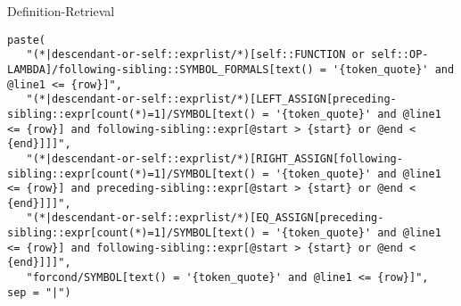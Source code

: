 \begin{frame}[fragile]{Definition-Retrieval}
%
\begin{verbatim}
paste(
   "(*|descendant-or-self::exprlist/*)[self::FUNCTION or self::OP-LAMBDA]/following-sibling::SYMBOL_FORMALS[text() = '{token_quote}' and @line1 <= {row}]",
   "(*|descendant-or-self::exprlist/*)[LEFT_ASSIGN[preceding-sibling::expr[count(*)=1]/SYMBOL[text() = '{token_quote}' and @line1 <= {row}] and following-sibling::expr[@start > {start} or @end < {end}]]]",
   "(*|descendant-or-self::exprlist/*)[RIGHT_ASSIGN[following-sibling::expr[count(*)=1]/SYMBOL[text() = '{token_quote}' and @line1 <= {row}] and preceding-sibling::expr[@start > {start} or @end < {end}]]]",
   "(*|descendant-or-self::exprlist/*)[EQ_ASSIGN[preceding-sibling::expr[count(*)=1]/SYMBOL[text() = '{token_quote}' and @line1 <= {row}] and following-sibling::expr[@start > {start} or @end < {end}]]]",
   "forcond/SYMBOL[text() = '{token_quote}' and @line1 <= {row}]",
sep = "|")
\end{verbatim}
\end{frame}

